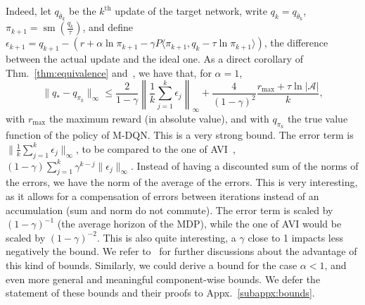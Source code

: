 \documentclass{article}
\DeclareMathOperator*{\softmax}{sm}
\newcommand{\actions}{\mathcal{A}}
\begin{document}
Indeed, let $q_{\bar{\theta}_k}$ be the $k^\text{th}$ update of the target network, write $q_k = q_{\bar{\theta}_k}$, $\pi_{k+1} = \softmax(\frac{q_k}{\tau})$, and define $\epsilon_{k+1} = q_{k+1} - (r + \alpha\ln\pi_{k+1} - \gamma P \langle \pi_{k+1}, q_k - \tau \ln\pi_{k+1}\rangle)$, the difference between the actual update and the ideal one. As a direct corollary of Thm.~\ref{thm:equivalence} and~\cite[Thm.~1]{vieillard2020leverage}, we have that, for $\alpha=1$,
\begin{equation}
    \|q_* - q_{\pi_k}\|_{\infty}\leq 
    \frac{2}{1-\gamma} \left\|\frac{1}{k}\sum_{j=1}^k \epsilon_j\right\|_\infty
    + \frac{4}{(1-\gamma)^2} \frac{r_\text{max}+\tau\ln|\actions|}{k},
\end{equation}
with $r_\text{max}$ the maximum reward (in absolute value), and with $q_{\pi_k}$ the true value function of the policy of M-DQN. This is a very strong bound. The error term is $\|\frac{1}{k}\sum_{j=1}^k \epsilon_j\|_\infty$, to be compared to the one of AVI~\cite{scherrer2015approximate}, $(1-\gamma) \sum_{j=1}^k \gamma^{k-j} \|\epsilon_j\|_\infty$. Instead of having a discounted sum of the norms of the errors, we have the norm of the average of the errors. This is very interesting, as it allows for a compensation of errors between iterations instead of an accumulation (sum and norm do not commute). The error term is scaled by $(1-\gamma)^{-1}$ (the average horizon of the MDP), while the one of AVI would be scaled by $(1-\gamma)^{-2}$. This is also quite interesting, a $\gamma$ close to 1 impacts less negatively the bound. We refer to~\cite[Sec.~4.1]{vieillard2020leverage} for further discussions about the advantage of this kind of bounds. Similarly, we could derive a bound for the case $\alpha<1$, and even more general and meaningful component-wise bounds. We defer the statement of these bounds and their proofs to Appx.~\ref{subappx:bounds}.
\end{document}
